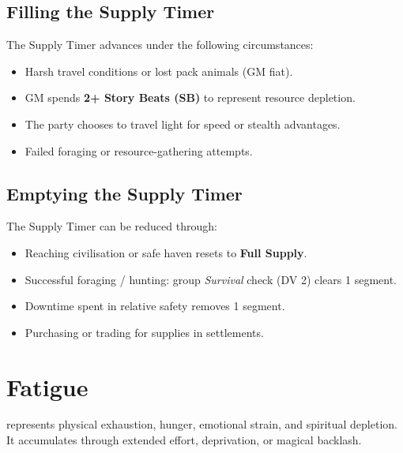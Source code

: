 \subsection{Filling the Supply Timer }\label{subsec:filling_supply}

The Supply Timer advances under the following circumstances:
\begin{itemize}
    \item Harsh travel conditions or lost pack animals (GM fiat).
    \item GM spends \textbf{2+ Story Beats (SB)} to represent resource depletion.
    \item The party chooses to travel light for speed or stealth advantages.
    \item Failed foraging or resource-gathering attempts.
\end{itemize}

\subsection{Emptying the Supply Timer }\label{subsec:emptying_supply}

The Supply Timer can be reduced through:
\begin{itemize}
    \item Reaching civilisation or safe haven resets to \textbf{Full Supply}.
    \item Successful foraging / hunting: group \emph{Survival} check (DV 2) clears 1 segment.
    \item Downtime spent in relative safety removes 1 segment.
    \item Purchasing or trading for supplies in settlements.
\end{itemize}

\section{Fatigue}\label{sec:fatigue}

 represents physical exhaustion, hunger, emotional strain, and spiritual depletion. It accumulates through extended effort, deprivation, or magical backlash.

